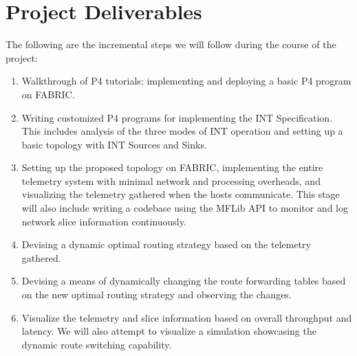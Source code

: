 \documentclass[conference]{IEEEtran}
\begin{document}
\section{Project Deliverables}
The following are the incremental steps we will follow during the course of the project:
\begin{enumerate}
\item Walkthrough of P4 tutorials; implementing and deploying a basic P4 program on FABRIC.
\item Writing customized P4 programs for implementing the INT Specification. This includes analysis of the three modes of INT operation and setting up a basic topology with INT Sources and Sinks.
\item Setting up the proposed topology on FABRIC, implementing the entire telemetry system with minimal network and processing overheads, and visualizing the telemetry gathered when the hosts communicate. This stage will also include writing a codebase using the MFLib API to monitor and log network slice information continuously.
\item Devising a dynamic optimal routing strategy based on the telemetry gathered.
\item Devising a means of dynamically changing the route forwarding tables based on the new optimal routing strategy and observing the changes.
\item Visualize the telemetry and slice information based on overall throughput and latency. We will also attempt to visualize a simulation showcasing the dynamic route switching capability.
\end{enumerate}
\end{document}
